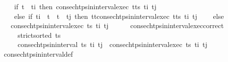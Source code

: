 \begin{isabellebody}
\ \ \ \ {\isacharparenleft}{\kern0pt}if\ t\ {\isacharless}{\kern0pt}\ t\isactrlsub i\ then\ consec{\isacharunderscore}{\kern0pt}htps{\isacharunderscore}{\kern0pt}in{\isacharunderscore}{\kern0pt}interval{\isacharunderscore}{\kern0pt}exec\ {\isacharparenleft}{\kern0pt}t{\isacharprime}{\kern0pt}{\isacharhash}{\kern0pt}ts{\isacharparenright}{\kern0pt}\ t\isactrlsub i\ t\isactrlsub j\isanewline
\ \ \ \ else\ if\ t\isactrlsub i\ {\isasymle}\ t\ {\isasymand}\ t{\isacharprime}{\kern0pt}\ {\isasymle}\ t\isactrlsub j\ then\ {\isacharparenleft}{\kern0pt}t{\isacharcomma}{\kern0pt}t{\isacharprime}{\kern0pt}{\isacharparenright}{\kern0pt}{\isacharhash}{\kern0pt}{\isacharparenleft}{\kern0pt}consec{\isacharunderscore}{\kern0pt}htps{\isacharunderscore}{\kern0pt}in{\isacharunderscore}{\kern0pt}interval{\isacharunderscore}{\kern0pt}exec\ {\isacharparenleft}{\kern0pt}t{\isacharprime}{\kern0pt}{\isacharhash}{\kern0pt}ts{\isacharparenright}{\kern0pt}\ t\isactrlsub i\ t\isactrlsub j{\isacharparenright}{\kern0pt}\isanewline
\ \ \ \ else\ {\isacharbrackleft}{\kern0pt}{\isacharbrackright}{\kern0pt}{\isacharparenright}{\kern0pt}{\isachardoublequoteclose}\isanewline
\ \ {\isacharbar}{\kern0pt}\ {\isachardoublequoteopen}consec{\isacharunderscore}{\kern0pt}htps{\isacharunderscore}{\kern0pt}in{\isacharunderscore}{\kern0pt}interval{\isacharunderscore}{\kern0pt}exec\ ts\ t\isactrlsub i\ t\isactrlsub j\ {\isacharequal}{\kern0pt}\ {\isacharbrackleft}{\kern0pt}{\isacharbrackright}{\kern0pt}{\isachardoublequoteclose}\isanewline
\isanewline
\ \ \isamarkupfalse%
\ consec{\isacharunderscore}{\kern0pt}htps{\isacharunderscore}{\kern0pt}in{\isacharunderscore}{\kern0pt}interval{\isacharunderscore}{\kern0pt}exec{\isacharunderscore}{\kern0pt}correct{\isacharcolon}{\kern0pt}\ \isanewline
\ \ \ \ \ {\isachardoublequoteopen}strict{\isacharunderscore}{\kern0pt}sorted\ ts{\isachardoublequoteclose}\isanewline
\ \ \ \ \ {\isachardoublequoteopen}consec{\isacharunderscore}{\kern0pt}htps{\isacharunderscore}{\kern0pt}in{\isacharunderscore}{\kern0pt}interval\ ts\ t\isactrlsub i\ t\isactrlsub j\ {\isacharequal}{\kern0pt}\ consec{\isacharunderscore}{\kern0pt}htps{\isacharunderscore}{\kern0pt}in{\isacharunderscore}{\kern0pt}interval{\isacharunderscore}{\kern0pt}exec\ ts\ t\isactrlsub i\ t\isactrlsub j{\isachardoublequoteclose}\isanewline
%
\isadelimproof
\ \ \ \ %
\endisadelimproof
%
\isatagproof
{}\isamarkupfalse%
\ consec{\isacharunderscore}{\kern0pt}htps{\isacharunderscore}{\kern0pt}in{\isacharunderscore}{\kern0pt}interval{\isacharunderscore}{\kern0pt}def\isanewline

\end{isabellebody}
